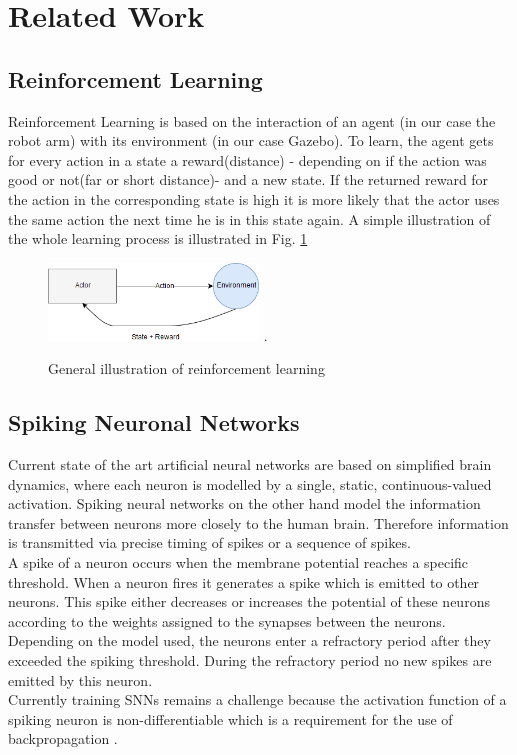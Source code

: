 \section{Related Work}
\subsection{Reinforcement Learning}%
Reinforcement Learning is based on the interaction of an agent (in our case the robot arm) with its environment (in our case Gazebo). To learn, the agent gets for every action in a state a reward(distance) - depending on if the action was good or not(far or short distance)- and a new state. If the returned reward for the action in the corresponding state is high it is more likely that the actor uses the same action the next time he is in this state again. A simple illustration of the whole learning process is illustrated in Fig. \ref{re_base}
\begin{figure}[H]
	\centering
	\includegraphics[width=2.2in]{img/re_base.png}
	\DeclareGraphicsExtensions.
	\caption{General illustration of reinforcement learning}
	\label{re_base}
\end{figure}

\subsection{Spiking Neuronal Networks}
Current state of the art artificial neural networks are based on simplified brain dynamics, where each neuron is modelled by a single, static, continuous-valued activation. Spiking neural networks on the other hand model the information transfer between neurons more closely to the human brain. Therefore information is transmitted via precise timing of spikes or a sequence of spikes.\\
A spike of a neuron occurs when the membrane potential reaches a specific threshold. When a neuron fires it generates a spike which is emitted to other neurons. This spike either decreases or increases the potential of these neurons according to the weights assigned to the synapses between the neurons. Depending on the model used, the neurons enter a refractory period after they exceeded the spiking threshold. During the refractory period no new spikes are emitted by this neuron.\\
Currently training SNNs remains a challenge because the activation function of a spiking neuron is non-differentiable which is a requirement for the use of backpropagation \cite{DBLP:journals/corr/abs-1804-08150}.



